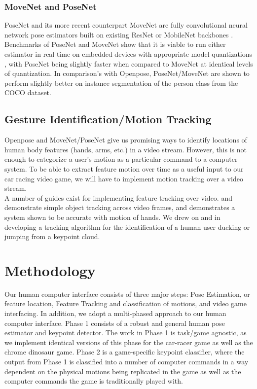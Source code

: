 \documentclass[10pt,twocolumn,letterpaper]{article}
\begin{document}
\subsubsection{MoveNet and PoseNet}

PoseNet and its more recent counterpart MoveNet are fully convolutional neural network pose 
estimators built on existing ResNet or MobileNet backbones \cite{PoseNet}. Benchmarks of PoseNet and MoveNet show that it is 
viable to run either estimator in real time on embedded devices with appropriate 
model quantizations \cite{tensorflowPoseNet}, with PoseNet being slightly faster when compared to MoveNet at identical 
levels of quantization. In comparison's with Openpose, PoseNet/MoveNet are shown to perform 
slightly better on instance segmentation of the person class from the COCO dataset.

\subsection{Gesture Identification/Motion Tracking}
Openpose and MoveNet/PoseNet give us promising ways to identify locations of human body features 
(hands, arms, etc.) in a video stream. However, this is not enough to categorize a user's motion 
as a particular command to a computer system. To be able to extract feature motion over time 
as a useful input to our car racing video game, we will have to implement motion tracking 
over a video stream.\\ 

A number of guides exist for implementing feature tracking over video. \cite{tracking_1} 
and \cite{tracking_2} demonstrate simple object tracking across video frames, and \cite{tracking_2} 
demonstrates a system shown to be accurate with motion of hands. We drew on \cite{tracking_1} and 
\cite{tracking_2} in developing a tracking algorithm for the identification of a human user ducking 
or jumping from a keypoint cloud.

\section{Methodology}
Our human computer interface consists of three major steps: Pose Estimation, or feature 
location, Feature Tracking and classification of motions, and video game interfacing. In addition, 
we adopt a multi-phased approach to our human computer interface. Phase 1 consists of a robust and 
general human pose estimator and keypoint detector. The work in Phase 1 is task/game agnostic, as 
we implement identical versions of this phase for the car-racer game as well as the chrome 
dinosaur game. Phase 2 is a game-specific keypoint classifier, where the output from Phase 1 is 
classified into a number of computer commands in a way dependent on the physical motions being 
replicated in the game as well as the computer commands the game is traditionally played with.\\
\end{document}

